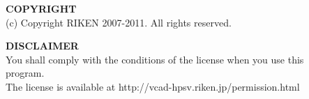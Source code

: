 \documentclass[a4paper,10pt,oneside,fleqn]{jsbook}
\newcounter{program}
\begin{document}
\vspace{14cm}

\begin{description}
\item[ ] \textbf{COPYRIGHT}\\
(c) Copyright RIKEN 2007-2011. All rights reserved.\\

\item[ ] \textbf{DISCLAIMER}\\
You shall comply with the conditions of the license when you use this program.\\
The license is available at http://vcad-hpsv.riken.jp/permission.html
\end{description}
%

\tableofcontents
%
%
\mainmatter

\end{document}
